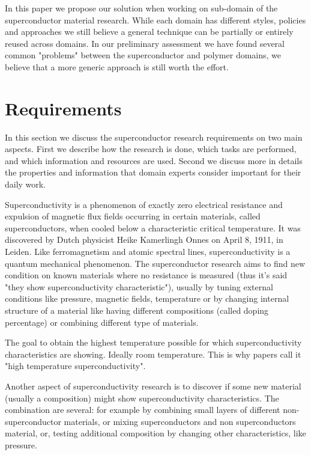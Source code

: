 \documentclass{article}
\begin{document}
In this paper we propose our solution when working on sub-domain of the superconductor material research. 
While each domain has different styles, policies and approaches we still believe a general technique can be partially or entirely reused across domains. In our preliminary assessment we have found several common "problems" between the superconductor and polymer domains, we believe that a more generic approach is still worth the effort. 


\section{Requirements}

In this section we discuss the superconductor research requirements on two main aspects. First we describe how the research is done, which tasks are performed, and which information and resources are used. Second we discuss more in details the properties and information that domain experts consider important for their daily work. 

Superconductivity is a phenomenon of exactly zero electrical resistance and expulsion of magnetic flux fields occurring in certain materials, called superconductors, when cooled below a characteristic critical temperature. It was discovered by Dutch physicist Heike Kamerlingh Onnes on April 8, 1911, in Leiden. Like ferromagnetism and atomic spectral lines, superconductivity is a quantum mechanical phenomenon.
The superconductor research aims to find new condition on known materials where no resistance is measured (thus it's said "they show superconductivity characteristic"), usually by tuning external conditions like pressure, magnetic fields, temperature or by changing internal structure of a material like having different compositions (called doping percentage) or combining different type of materials.

The goal to obtain the highest temperature possible for which superconductivity characteristics are showing. Ideally room temperature. This is why papers call it "high temperature superconductivity". 

Another aspect of superconductivity research is to discover if some new material (usually a composition) might show superconductivity characteristics. The combination are several: for example by combining small layers of different non-superconductor materials, or mixing superconductors and non superconductors material, or, testing additional composition by changing other characteristics, like pressure. 
\end{document}
